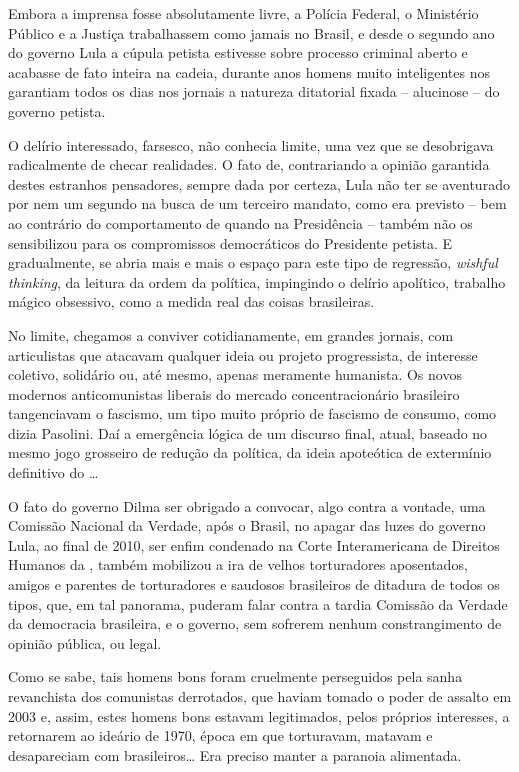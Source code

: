 Embora a imprensa fosse absolutamente livre, a Polícia Federal, o
Ministério Público e a Justiça trabalhassem como jamais no Brasil, e
desde o segundo ano do governo Lula a cúpula petista estivesse sobre
processo criminal aberto e acabasse de fato inteira na cadeia, durante
anos homens muito inteligentes nos garantiam todos os dias nos jornais a
natureza ditatorial fixada -- alucinose -- do governo petista.

O delírio interessado, farsesco, não conhecia limite, uma vez que se
desobrigava radicalmente de checar realidades. O fato de, contrariando a
opinião garantida destes estranhos pensadores, sempre dada por certeza,
Lula não ter se aventurado por nem um segundo na busca de um terceiro
mandato, como era previsto -- bem ao contrário do comportamento de 
quando na Presidência -- também não os sensibilizou para os compromissos
democráticos do Presidente petista. E gradualmente, se abria mais e mais
o espaço para este tipo de regressão, \emph{wishful thinking}, da
leitura da ordem da política, impingindo o delírio apolítico, trabalho
mágico obsessivo, como a medida real das coisas brasileiras.

No limite, chegamos a conviver cotidianamente, em grandes jornais, com
articulistas que atacavam qualquer ideia ou projeto progressista, de
interesse coletivo, solidário ou, até mesmo, apenas meramente humanista.
Os novos modernos anticomunistas liberais do mercado concentracionário
brasileiro tangenciavam o fascismo, um tipo muito próprio de fascismo de
consumo, como dizia Pasolini. Daí a emergência lógica de um discurso
final, atual, baseado no mesmo jogo grosseiro de redução da política, da
ideia apoteótica de extermínio definitivo do …

O fato do governo Dilma ser obrigado a convocar, algo contra a vontade,
uma Comissão Nacional da Verdade, após o Brasil, no apagar das luzes do
governo Lula, ao final de 2010, ser enfim condenado na Corte
Interamericana de Direitos Humanos da , também mobilizou a ira de
velhos torturadores aposentados, amigos e parentes de torturadores e
saudosos brasileiros de ditadura de todos os tipos, que, em tal
panorama, puderam falar contra a tardia Comissão da Verdade da
democracia brasileira, e o governo, sem sofrerem nenhum constrangimento
de opinião pública, ou legal.

Como se sabe, tais homens bons foram cruelmente perseguidos pela sanha
revanchista dos comunistas derrotados, que haviam tomado o poder de
assalto em 2003 e, assim, estes homens bons estavam legitimados, pelos
próprios interesses, a retornarem ao ideário de 1970, época em que
torturavam, matavam e desapareciam com brasileiros… Era preciso manter
a paranoia alimentada.

